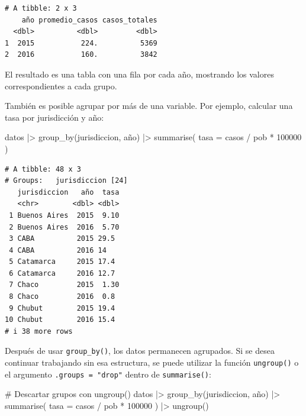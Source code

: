 \documentclass[
  spanish,
  a4paper,
]{scrbook}
\newenvironment{Shaded}{\begin{snugshade}}{\end{snugshade}}
\newcommand{\AttributeTok}[1]{\textcolor[rgb]{0.40,0.45,0.13}{#1}}
\newcommand{\CommentTok}[1]{\textcolor[rgb]{0.37,0.37,0.37}{#1}}
\newcommand{\DecValTok}[1]{\textcolor[rgb]{0.68,0.00,0.00}{#1}}
\newcommand{\FunctionTok}[1]{\textcolor[rgb]{0.28,0.35,0.67}{#1}}
\newcommand{\NormalTok}[1]{\textcolor[rgb]{0.00,0.23,0.31}{#1}}
\newcommand{\SpecialCharTok}[1]{\textcolor[rgb]{0.37,0.37,0.37}{#1}}
\begin{document}
\begin{verbatim}
# A tibble: 2 x 3
    año promedio_casos casos_totales
  <dbl>          <dbl>         <dbl>
1  2015           224.          5369
2  2016           160.          3842
\end{verbatim}

El resultado es una tabla con una fila por cada año, mostrando los
valores correspondientes a cada grupo.

También es posible agrupar por más de una variable. Por ejemplo,
calcular una tasa por jurisdicción y año:

\begin{Shaded}
\begin{Highlighting}[]
\NormalTok{datos }\SpecialCharTok{|\textgreater{}}
  \FunctionTok{group\_by}\NormalTok{(jurisdiccion, año) }\SpecialCharTok{|\textgreater{}}
  \FunctionTok{summarise}\NormalTok{(}
    \AttributeTok{tasa =}\NormalTok{ casos }\SpecialCharTok{/}\NormalTok{ pob }\SpecialCharTok{*} \DecValTok{100000}
\NormalTok{  )}
\end{Highlighting}
\end{Shaded}

\begin{verbatim}
# A tibble: 48 x 3
# Groups:   jurisdiccion [24]
   jurisdiccion   año  tasa
   <chr>        <dbl> <dbl>
 1 Buenos Aires  2015  9.10
 2 Buenos Aires  2016  5.70
 3 CABA          2015 29.5 
 4 CABA          2016 14   
 5 Catamarca     2015 17.4 
 6 Catamarca     2016 12.7 
 7 Chaco         2015  1.30
 8 Chaco         2016  0.8 
 9 Chubut        2015 19.4 
10 Chubut        2016 15.4 
# i 38 more rows
\end{verbatim}

Después de usar \texttt{group\_by()}, los datos permanecen agrupados. Si
se desea continuar trabajando sin esa estructura, se puede utilizar la
función \texttt{ungroup()} o el argumento \texttt{.groups\ =\ "drop"}
dentro de \texttt{summarise()}:

\begin{Shaded}
\begin{Highlighting}[]
\CommentTok{\# Descartar grupos con ungroup()}
\NormalTok{datos }\SpecialCharTok{|\textgreater{}}
  \FunctionTok{group\_by}\NormalTok{(jurisdiccion, año) }\SpecialCharTok{|\textgreater{}}
  \FunctionTok{summarise}\NormalTok{(}
    \AttributeTok{tasa =}\NormalTok{ casos }\SpecialCharTok{/}\NormalTok{ pob }\SpecialCharTok{*} \DecValTok{100000}
\NormalTok{  ) }\SpecialCharTok{|\textgreater{}}
  \FunctionTok{ungroup}\NormalTok{()}
\end{Highlighting}
\end{Shaded}
\end{document}
